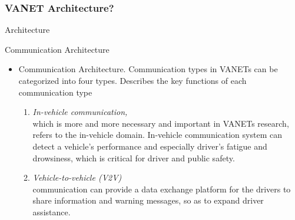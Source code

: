 \documentclass{beamer}
\begin{document}
\begin{frame}
	
	\frametitle{VANET Architecture?}
	\begin{block}{Architecture}
		\begin{block}{Communication Architecture}
			\begin{itemize}
				
				
				
				\item Communication Architecture. 
				Communication types in VANETs can be categorized into four types. 
				Describes the key functions of each communication type
				\begin{enumerate}
					\item \textit{In-vehicle communication,}\\ which is more and more necessary and important in VANETs research, refers to the in-vehicle domain. In-vehicle communication system can detect a vehicle’s performance and especially driver’s fatigue and drowsiness, which is critical for driver and public safety.
				\item \textit{Vehicle-to-vehicle (V2V)}\\ communication can provide a data exchange platform for the drivers to share information and warning messages, so as to expand driver assistance.
			\end{enumerate}
				
				
				
				
			\end{itemize}
		\end{block}
	\end{block}
	
\end{frame}

\end{document}
